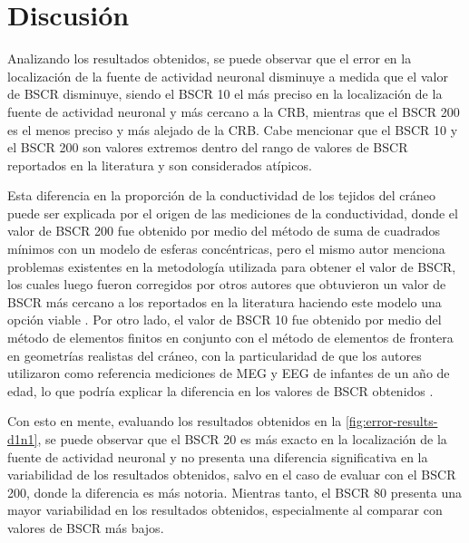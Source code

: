 %
\chapter{Discusión}
\label{sec:discusion}



Analizando los resultados obtenidos, se puede observar que el error en la localización de la fuente de actividad neuronal disminuye a medida que el valor de BSCR disminuye, siendo el BSCR 10 el más preciso en la localización de la fuente de actividad neuronal y más cercano a la CRB, mientras que el BSCR 200 es el menos preciso y más alejado de la CRB.
Cabe mencionar que el BSCR 10 y el BSCR 200 son valores extremos dentro del rango de valores de BSCR reportados en la literatura y son considerados atípicos. 

Esta diferencia en la proporción de la conductividad de los tejidos del cráneo puede ser explicada por el origen de las mediciones de la conductividad, donde el valor de BSCR 200 fue obtenido por medio del método de suma de cuadrados mínimos con un modelo de esferas concéntricas, pero el mismo autor menciona problemas existentes en la metodología utilizada para obtener el valor de BSCR, los cuales luego fueron corregidos por otros autores que obtuvieron un valor de BSCR más cercano a los reportados en la literatura haciendo este modelo una opción viable \cite{eriksenVivoHumanHead1990, Gutierrez2004}. 
Por otro lado, el valor de BSCR 10 fue obtenido por medio del método de elementos finitos en conjunto con el método de elementos de frontera en geometrías realistas del cráneo, con la particularidad de que los autores utilizaron como referencia mediciones de MEG y EEG de infantes de un año de edad, lo que podría explicar la diferencia en los valores de BSCR obtenidos \cite{acarHighresolutionEEGSource2016}.

Con esto en mente, evaluando los resultados obtenidos en la \cref{fig:error-results-d1n1}, se puede observar que el BSCR 20 es más exacto en la localización de la fuente de actividad neuronal y no presenta una diferencia significativa en la variabilidad de los resultados obtenidos, salvo en el caso de evaluar con el BSCR 200, donde la diferencia es más notoria. 
Mientras tanto, el BSCR 80 presenta una mayor variabilidad en los resultados obtenidos, especialmente al comparar con valores de BSCR más bajos.  
